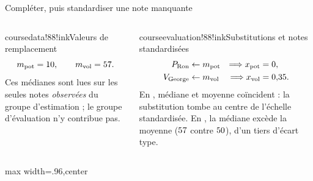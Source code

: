 \begin{frame}[t]{Compléter, puis standardiser une note manquante}
  \vspace{3mm}
  \begin{columns}[T,onlytextwidth]
      \begin{coursecallout}{coursedata!88!ink}{Valeurs de remplacement}
        \[
          m_{\mathrm{pot}}=10,
          \qquad m_{\mathrm{vol}}=57.
        \]
        Ces médianes sont lues sur les seules notes \emph{observées} du groupe
        d'estimation ; le groupe d'évaluation n'y contribue pas.
      \end{coursecallout}
      \begin{coursecallout}{courseevaluation!88!ink}{Substitutions et notes
        standardisées}
        \[
          \begin{aligned}
            P_{\text{Ron}}&\leftarrow m_{\mathrm{pot}}
              &\Longrightarrow x_{\mathrm{pot}}&=0,\\
            V_{\text{George}}&\leftarrow m_{\mathrm{vol}}
              &\Longrightarrow x_{\mathrm{vol}}&=0{,}35.
          \end{aligned}
        \]
        En \PotionsName{}, médiane et moyenne coïncident : la substitution tombe
        au centre de l'échelle standardisée. En \VolName{}, la médiane excède la
        moyenne (\(57\) contre \(50\)), d'un tiers
        d'écart type.
      \end{coursecallout}
  \end{columns}
  \vfill
  \centering
  \begin{adjustbox}{max width=.96\textwidth,center}
  \end{adjustbox}
\end{frame}

